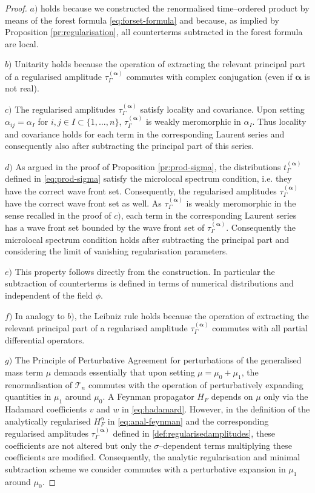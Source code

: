 \documentclass[a4paper,10pt,twoside]{article}
\numberwithin{equation}{section}
\newcounter{and}
\def\balpha{{\boldsymbol{\alpha}}}
\theoremstyle{plain}
\theoremstyle{definition}
\begin{document}
\begin{proof}
$a)$ holds because we constructed the renormalised time--ordered product by means of the forest formula \eqref{eq:forset-formula} and because, as implied by Proposition \ref{pr:regularisation}, all counterterms subtracted in the forest formula are local.

$b)$ Unitarity holds because the operation of extracting the relevant principal part of a regularised amplitude $\tau^{(\balpha)}_\Gamma$ commutes with complex conjugation (even if $\balpha$ is not real).

$c)$ The regularised amplitudes $\tau^{(\balpha)}_\Gamma$ satisfy locality and covariance. Upon setting $\alpha_{ij}=\alpha_I$ for $i,j\in I\subset \{1,\dots,n\}$, $\tau^{(\balpha)}_\Gamma$ is weakly meromorphic in $\alpha_I$. Thus locality and covariance holds for each term in the corresponding Laurent series and consequently also after subtracting the principal part of this series.

$d)$ As argued in the proof of Proposition \ref{pr:prod-sigma}, the distributions $t^{(\balpha)}_\Gamma$ defined in \eqref{eq:prod-sigma} satisfy the microlocal spectrum condition, i.e. they have the correct wave front set. Consequently, the regularised amplitudes $\tau^{(\balpha)}_\Gamma$ have the correct wave front set as well. As $\tau^{(\balpha)}_\Gamma$ is weakly meromorphic in the sense recalled in the proof of $c)$, each term in the corresponding Laurent series has a wave front set bounded by the wave front set of $\tau^{(\balpha)}_\Gamma$. Consequently the microlocal spectrum condition holds after subtracting the principal part and considering the limit of vanishing regularisation parameters.

$e)$ This property follows directly from the construction. In particular the subtraction of counterterms is defined in terms of numerical distributions and independent of the field $\phi$.

$f)$ In analogy to $b)$, the Leibniz rule holds because the operation of extracting the relevant principal part of a regularised amplitude $\tau^{(\balpha)}_\Gamma$ commutes with all partial differential operators.

$g)$ The Principle of Perturbative Agreement for perturbations of the generalised mass term $\mu$ demands essentially that upon setting $\mu=\mu_0 + \mu_1$, the renormalisation of $\mathcal{T}_n$ commutes with the operation of perturbatively expanding quantities in $\mu_1$ around $\mu_0$. A Feynman propagator $H_F$ depends on $\mu$ only via the Hadamard coefficients $v$ and $w$ in \eqref{eq:hadamard}. However, in the definition of the analytically regularised $H^{\alpha}_F$ in \eqref{eq:anal-feynman} and the corresponding regularised amplitudes $\tau^{(\balpha)}_\Gamma$ defined in \eqref{def:regularisedamplitudes}, these coefficients are not altered but only the $\sigma$--dependent terms multiplying these coefficients are modified. Consequently, the analytic regularisation and minimal subtraction scheme we consider commutes with a perturbative expansion in $\mu_1$ around $\mu_0$.


\end{proof}
\end{document}
